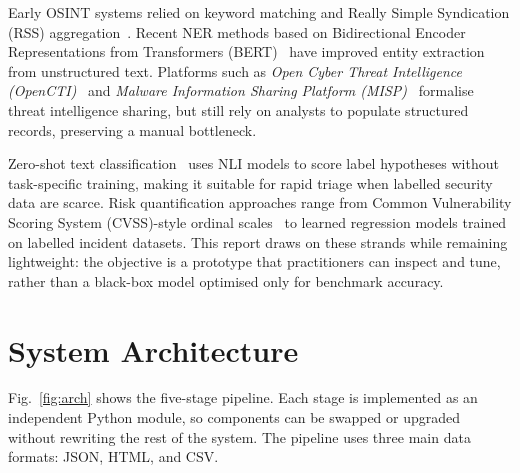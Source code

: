 \documentclass[12pt,lettersize,journal,onecolumn]{IEEEtran}
\begin{document}
Early OSINT systems relied on keyword matching and Really Simple Syndication (RSS) aggregation~\cite{Schaurer2010}. Recent NER methods based on Bidirectional Encoder Representations from Transformers (BERT)~\cite{devlin2019bert} have improved entity extraction from unstructured text. Platforms such as \emph{Open Cyber Threat Intelligence (OpenCTI)}~\cite{opencti2021} and \emph{Malware Information Sharing Platform (MISP)}~\cite{misp2016} formalise threat intelligence sharing, but still rely on analysts to populate structured records, preserving a manual bottleneck.

Zero-shot text classification~\cite{yin2019benchmark} uses NLI models to score label hypotheses without task-specific training, making it suitable for rapid triage when labelled security data are scarce. Risk quantification approaches range from Common Vulnerability Scoring System (CVSS)-style ordinal scales~\cite{cvss2019} to learned regression models trained on labelled incident datasets. This report draws on these strands while remaining lightweight: the objective is a prototype that practitioners can inspect and tune, rather than a black-box model optimised only for benchmark accuracy.

% 
\section{System Architecture}
\label{sec:arch}
% 

Fig.~\ref{fig:arch} shows the five-stage pipeline. Each stage is implemented as an independent Python module, so components can be swapped or upgraded without rewriting the rest of the system. The pipeline uses three main data formats: JSON, HTML, and CSV.
\end{document}
